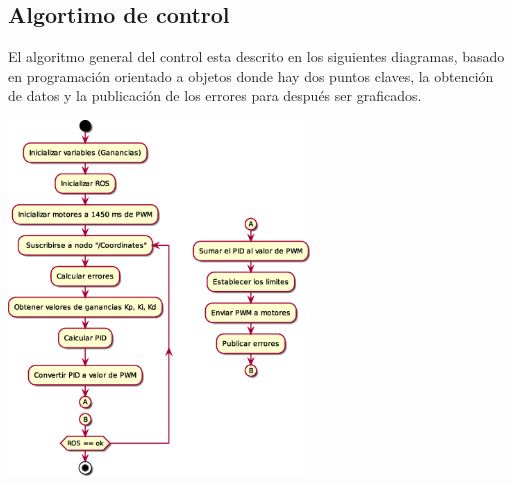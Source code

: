 \subsection{Algortimo de control}
El algoritmo general del control esta descrito en los siguientes diagramas, basado en programación orientado a objetos
donde hay dos puntos claves, la obtención de datos y la publicación de los errores para después ser graficados.
\begin{center}
	\includegraphics[width=0.6\textwidth]{Contenido/Cuerpo/Capitulo5/Fig7.eps}
	\label{Fig4}
\end{center}


